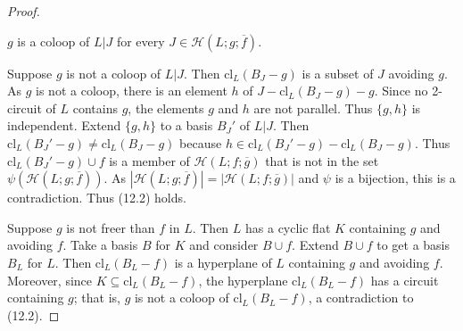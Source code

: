 \documentclass[10pt,a4paper]{amsart}
\newcommand{\cl}{\text{cl}}
\begin{document}
\begin{proof}
    \begin{sublemma}
        $g$ is a coloop of $L|J$ for every $J\in \mathcal{H}(L;g;\overline f)$.  
    \end{sublemma}

    Suppose $g$ is not a coloop of $L|J$. 
    Then $\cl_{L}(B_J-g)$ is a subset of $J$ avoiding $g$. 
    As $g$ is not a coloop, there is an element $h$ of $J-\cl_{L}(B_J-g)-g$. 
    Since no 2-circuit of $L$ contains $g$, the elements $g$ and $h$ are not parallel. 
    Thus $\{g,h\}$ is independent. 
    Extend $\{g,h\}$ to a basis $B_J'$ of $L|J$. 
    Then $\cl_{L}(B_J'-g)\neq\cl_{L}(B_J-g)$ because $h\in \cl_{L}(B_J'-g)-\cl_{L}(B_J-g)$. 
    Thus $\cl_{L}(B_J'-g)\cup f$ is a member of $\mathcal{H}(L;f;\overline g)$ that is not in the set $\psi(\mathcal{H}(L;g;\overline f))$.
    As $|\mathcal{H}(L;g;\overline f)|=|\mathcal{H}(L;f;\overline g)|$ and $\psi$ is a bijection, this is a contradiction. Thus (12.2) holds. 

    \smallskip

    Suppose $g$ is not freer than $f$ in $L$.
    Then $L$ has a cyclic flat $K$ containing $g$ and avoiding $f$. 
    Take a basis $B$ for $K$ and consider $B \cup f$. 
    Extend $B\cup f$ to get a basis $B_{L}$ for $L$. 
    Then $\cl_L(B_{L}-f)$ is a hyperplane of $L$ containing $g$ and avoiding $f$. 
    Moreover, since $K\subseteq \cl_L(B_{L}-f)$, the hyperplane $\cl_L(B_{L}-f)$ has a circuit containing $g$; that is, $g$ is not a coloop of $\cl_L(B_{L}-f)$, a contradiction to (12.2).
       \end{proof} 
\end{document}
